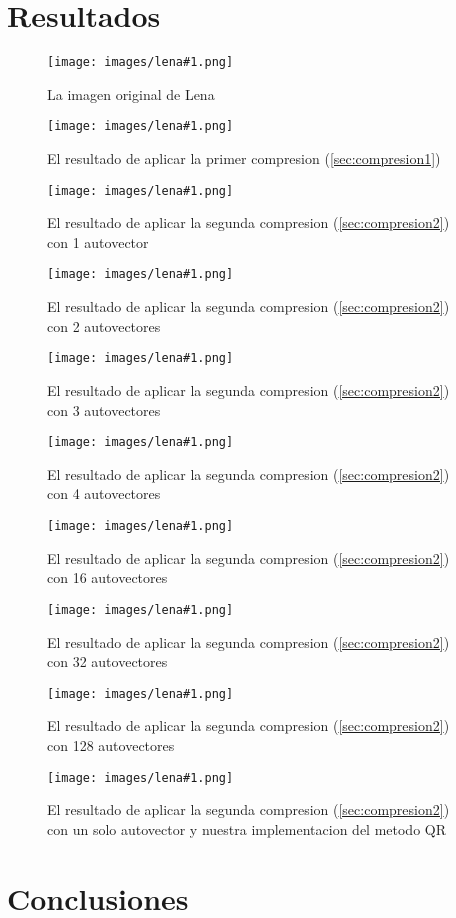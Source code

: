 \documentclass[twocolumn,a4paper,10pt]{article}
\begin{document}
\section{Resultados}

\newcommand{\lena}[2]{
    \begin{figure}[H]
        \label{lena#1}
        \texttt{[image: images/lena\#1.png]}
        \caption{#2}
    \end{figure}
}

\lena{512}{La imagen original de Lena}

\lena{-bruta}{El resultado de aplicar la primer compresion (\ref{sec:compresion1})}

\lena{-eig-1}{El resultado de aplicar la segunda compresion (\ref{sec:compresion2}) con 1 autovector}
\lena{-eig-2}{El resultado de aplicar la segunda compresion (\ref{sec:compresion2}) con 2 autovectores}
\lena{-eig-3}{El resultado de aplicar la segunda compresion (\ref{sec:compresion2}) con 3 autovectores}
\lena{-eig-4}{El resultado de aplicar la segunda compresion (\ref{sec:compresion2}) con 4 autovectores}
\lena{-eig-16}{El resultado de aplicar la segunda compresion (\ref{sec:compresion2}) con 16 autovectores}
\lena{-eig-32}{El resultado de aplicar la segunda compresion (\ref{sec:compresion2}) con 32 autovectores}
\lena{-eig-128}{El resultado de aplicar la segunda compresion (\ref{sec:compresion2}) con 128 autovectores}

\lena{-qr-1}{El resultado de aplicar la segunda compresion (\ref{sec:compresion2}) con un solo autovector y nuestra implementacion del metodo QR}


\section{Conclusiones}
\end{document}
